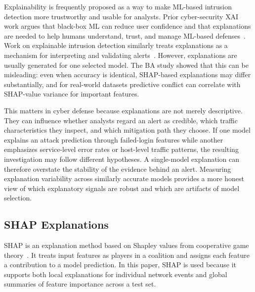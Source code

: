 Explainability is frequently proposed as a way to make \gls{ML}-based intrusion detection more trustworthy and usable for analysts. Prior cyber-security \gls{XAI} work argues that black-box \gls{ML} can reduce user confidence and that explanations are needed to help humans understand, trust, and manage \gls{ML}-based defenses~\cite{kluge2025MILCOM}. Work on explainable intrusion detection similarly treats explanations as a mechanism for interpreting and validating alerts~\cite{szczepanski2020achieving}. However, explanations are usually generated for one selected model. The BA study showed that this can be misleading: even when accuracy is identical, \gls{SHAP}-based explanations may differ substantially, and for real-world datasets predictive conflict can correlate with \gls{SHAP}-value variance for important features.

This matters in cyber defense because explanations are not merely descriptive. They can influence whether analysts regard an alert as credible, which traffic characteristics they inspect, and which mitigation path they choose. If one model explains an attack prediction through failed-login features while another emphasizes service-level error rates or host-level traffic patterns, the resulting investigation may follow different hypotheses. A single-model explanation can therefore overstate the stability of the evidence behind an alert. Measuring explanation variability across similarly accurate models provides a more honest view of which explanatory signals are robust and which are artifacts of model selection.

\subsection{\gls{SHAP} Explanations}

\gls{SHAP} is an explanation method based on Shapley values from cooperative game theory~\cite{shapley1953value,lundberg2017unified}. It treats input features as players in a coalition and assigns each feature a contribution to a model prediction. In this paper, \gls{SHAP} is used because it supports both local explanations for individual network events and global summaries of feature importance across a test set.

